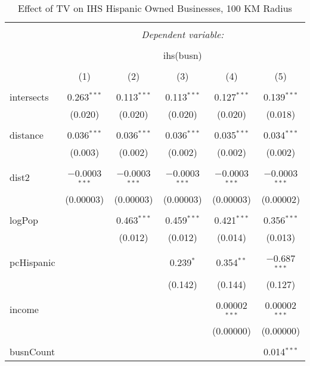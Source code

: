 
\begin{table}[!htbp] \centering 
  \caption{Effect of TV on IHS Hispanic Owned Businesses, 100 KM Radius} 
  \label{} 
\begin{tabular}{@{\extracolsep{-5pt}}lccccc} 
\\[-1.8ex]\hline 
\hline \\[-1.8ex] 
 & \multicolumn{5}{c}{\textit{Dependent variable:}} \\ 
\cline{2-6} 
\\[-1.8ex] & \multicolumn{5}{c}{ihs(busn)} \\ 
\\[-1.8ex] & (1) & (2) & (3) & (4) & (5)\\ 
\hline \\[-1.8ex] 
 intersects & 0.263$^{***}$ & 0.113$^{***}$ & 0.113$^{***}$ & 0.127$^{***}$ & 0.139$^{***}$ \\ 
  & (0.020) & (0.020) & (0.020) & (0.020) & (0.018) \\ 
  & & & & & \\ 
 distance & 0.036$^{***}$ & 0.036$^{***}$ & 0.036$^{***}$ & 0.035$^{***}$ & 0.034$^{***}$ \\ 
  & (0.003) & (0.002) & (0.002) & (0.002) & (0.002) \\ 
  & & & & & \\ 
 dist2 & $-$0.0003$^{***}$ & $-$0.0003$^{***}$ & $-$0.0003$^{***}$ & $-$0.0003$^{***}$ & $-$0.0003$^{***}$ \\ 
  & (0.00003) & (0.00003) & (0.00003) & (0.00003) & (0.00002) \\ 
  & & & & & \\ 
 logPop &  & 0.463$^{***}$ & 0.459$^{***}$ & 0.421$^{***}$ & 0.356$^{***}$ \\ 
  &  & (0.012) & (0.012) & (0.014) & (0.013) \\ 
  & & & & & \\ 
 pcHispanic &  &  & 0.239$^{*}$ & 0.354$^{**}$ & $-$0.687$^{***}$ \\ 
  &  &  & (0.142) & (0.144) & (0.127) \\ 
  & & & & & \\ 
 income &  &  &  & 0.00002$^{***}$ & 0.00002$^{***}$ \\ 
  &  &  &  & (0.00000) & (0.00000) \\ 
  & & & & & \\ 
 busnCount &  &  &  &  & 0.014$^{***}$ \\ 

\end{tabular}
\end{table}
